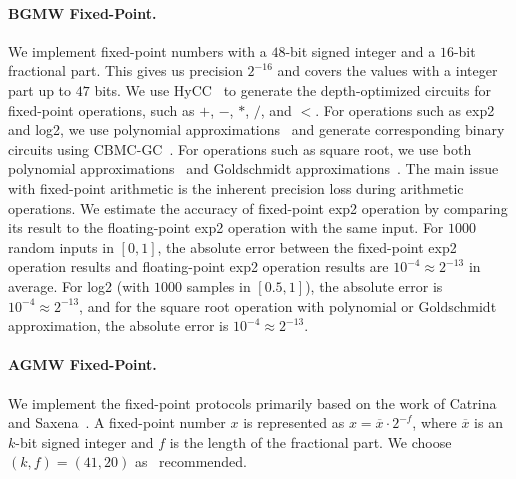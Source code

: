 \paragraph{BGMW Fixed-Point.}
We implement fixed-point numbers with a $48$-bit signed integer and a $16$-bit fractional part.
This gives us precision $2^{-16}$ and covers the values with a integer part up to $47$ bits.
We use HyCC~\cite{buscher2018hycc} to generate the depth-optimized circuits for fixed-point operations, such as $+$, $-$, $*$, $/$, and $<$.
For operations such as exp2 and log2, we use polynomial approximations~\cite{hart1978computer,aly2019benchmarking} and generate corresponding binary circuits using CBMC-GC~\cite{buscher2016compiling}.
For operations such as square root, we use both polynomial approximations~\cite{hart1978computer} and Goldschmidt approximations~\cite{markstein2004software,aly2019benchmarking}.
The main issue with fixed-point arithmetic is the inherent precision loss during arithmetic operations.
We estimate the accuracy of fixed-point exp2 operation by comparing its result to the floating-point exp2 operation with the same input.
For $1000$ random inputs in $\left[0,1\right]$, the absolute error between the fixed-point exp2 operation results and floating-point exp2 operation results are $10^{-4}\approx 2^{-13}$ in average.
For log2 (with $1000$ samples in $\left[0.5,1\right] $), the absolute error is $10^{-4}\approx 2^{-13}$, and for the square root operation with polynomial or Goldschmidt approximation, the absolute error is $10^{-4}\approx 2^{-13}$.

\paragraph{AGMW Fixed-Point.}
\label{para:AGMWFixed-Point}
We implement the \arithmeticGMW fixed-point protocols primarily based on the work of Catrina and Saxena~\cite{catrina2010secure}. A fixed-point number $x$ is represented as $x = \overline{x}\cdot  2^{-f}$, where $\overline{x}$ is an $k$-bit signed integer and $f$ is the length of the fractional part.
We choose $\left(k,f\right)=\left(41,20\right)  $ as~\cite{aly2021scale} recommended.

